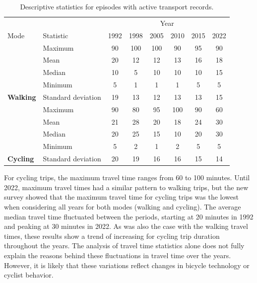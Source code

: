 \documentclass[preprint, 3p,
authoryear]{elsarticle} %
\begin{document}
\begin{table}
\centering
\caption{\label{tab:table-02}\label{tab:decrip-analysis}Descriptive statistics for episodes with active transport records.}
\centering
\fontsize{10}{12}\selectfont
\begin{tabular}[t]{>{}llcccccc}
\toprule
\multicolumn{2}{c}{ } & \multicolumn{6}{c}{Year} \\
\cmidrule(l{3pt}r{3pt}){3-8}
Mode & Statistic & 1992 & 1998 & 2005 & 2010 & 2015 & 2022\\
\midrule
 & Maximum & 90 & 100 & 100 & 90 & 95 & 90\\

 & Mean & 20 & 12 & 12 & 13 & 16 & 18\\

 & Median & 10 & 5 & 10 & 10 & 10 & 15\\

 & Minimum & 5 & 1 & 1 & 1 & 5 & 5\\

\multirow[t]{-5}{*}{\raggedright\arraybackslash \textbf{Walking}} & Standard deviation & 19 & 13 & 12 & 13 & 13 & 15\\
\cmidrule{1-8}
 & Maximum & 90 & 80 & 95 & 100 & 90 & 60\\

 & Mean & 21 & 28 & 20 & 18 & 24 & 30\\

 & Median & 20 & 25 & 15 & 10 & 20 & 30\\

 & Minimum & 5 & 2 & 1 & 2 & 5 & 5\\

\multirow[t]{-5}{*}{\raggedright\arraybackslash \textbf{Cycling}} & Standard deviation & 20 & 19 & 16 & 16 & 15 & 14\\
\bottomrule
\end{tabular}
\end{table}

For cycling trips, the maximum travel time ranges from 60 to 100
minutes. Until 2022, maximum travel times had a similar pattern to
walking trips, but the new survey showed that the maximum travel time
for cycling trips was the lowest when considering all years for both
modes (walking and cycling). The average median travel time fluctuated
between the periods, starting at 20 minutes in 1992 and peaking at 30
minutes in 2022. As was also the case with the walking travel times,
these results show a trend of increasing for cycling trip duration
throughout the years. The analysis of travel time statistics alone does
not fully explain the reasons behind these fluctuations in travel time
over the years. However, it is likely that these variations reflect
changes in bicycle technology or cyclist behavior.
\end{document}
